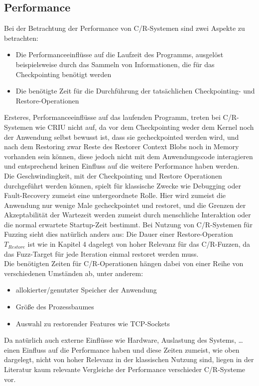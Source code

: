 \documentclass[a4paper]{article}
\begin{document}
\subsection{Performance}
Bei der Betrachtung der Performance von C/R-Systemen sind zwei Aspekte zu betrachten: 
\begin{itemize}
    \item Die Performanceeinflüsse auf die Laufzeit des Programms, ausgelöst beispielsweise durch das Sammeln von Informationen, die für das Checkpointing benötigt werden
    \item Die benötigte Zeit für die Durchführung der tatsächlichen Checkpointing- und Restore-Operationen
\end{itemize}
Ersteres, Performanceeinflüsse auf das laufenden Programm, treten bei C/R-Systemen wie CRIU nicht auf, da vor dem Checkpointing weder dem Kernel noch der Anwendung selbst bewusst ist, dass sie gecheckpointed werden wird, und nach dem Restoring zwar Reste des Restorer Context Blobs noch in Memory vorhanden sein können, diese jedoch nicht mit dem Anwendungscode interagieren und entsprechend keinen Einfluss auf die weitere Performance haben werden.\\
Die Geschwindingkeit, mit der Checkpointing und Restore Operationen durchgeführt werden können, spielt für klassische Zwecke wie Debugging oder Fault-Recovery zumeist eine untergeordnete Rolle. 
Hier wird zumeist die Anwendung nur wenige Male gecheckpointet und restoret, und die Grenzen der Akzeptabilität der Wartezeit werden zumeist durch menschliche Interaktion oder die normal erwartete Startup-Zeit bestimmt.
Bei Nutzung von C/R-Systemen für Fuzzing sieht dies natürlich anders aus: Die Dauer einer Restore-Operation $T_{Restore}$ ist wie in Kapitel 4 dagelegt von hoher Relevanz für das C/R-Fuzzen, da das Fuzz-Target für jede Iteration einmal restoret werden muss.\\
Die benötigten Zeiten für C/R-Operationen hängen dabei von einer Reihe von verschiedenen Umständen ab, unter anderem:
\begin{itemize}
    \item allokierter/genutzter Speicher der Anwendung
    \item Größe des Prozessbaumes
    \item Auswahl zu restorender Features wie TCP-Sockets
\end{itemize}
Da natürlich auch externe Einflüsse wie Hardware, Auslastung des Systems, \dots einen Einfluss auf die Performance haben und diese Zeiten zumeist, wie oben dargelegt, nicht von hoher Relevanz in der klassischen Nutzung sind, liegen in der Literatur kaum relevante Vergleiche der Performance verschieder C/R-Systeme vor.
\end{document}
